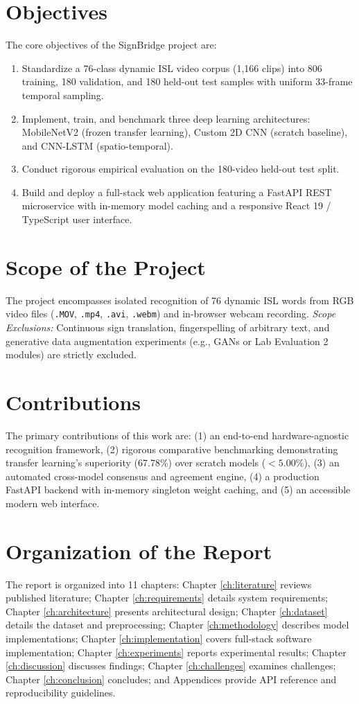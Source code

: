 \section{Objectives}
\label{sec:objectives}
The core objectives of the SignBridge project are:
\begin{enumerate}
    \item Standardize a 76-class dynamic ISL video corpus (1,166 clips) into 806 training, 180 validation, and 180 held-out test samples with uniform 33-frame temporal sampling.
    \item Implement, train, and benchmark three deep learning architectures: MobileNetV2 (frozen transfer learning), Custom 2D CNN (scratch baseline), and CNN-LSTM (spatio-temporal).
    \item Conduct rigorous empirical evaluation on the 180-video held-out test split.
    \item Build and deploy a full-stack web application featuring a FastAPI REST microservice with in-memory model caching and a responsive React 19 / TypeScript user interface.
\end{enumerate}

\section{Scope of the Project}
\label{sec:scope}
The project encompasses isolated recognition of 76 dynamic ISL words from RGB video files (\texttt{.MOV}, \texttt{.mp4}, \texttt{.avi}, \texttt{.webm}) and in-browser webcam recording. 
\textit{Scope Exclusions:} Continuous sign translation, fingerspelling of arbitrary text, and generative data augmentation experiments (e.g., GANs or Lab Evaluation 2 modules) are strictly excluded.

\section{Contributions}
\label{sec:contributions}
The primary contributions of this work are: (1) an end-to-end hardware-agnostic recognition framework, (2) rigorous comparative benchmarking demonstrating transfer learning's superiority (67.78\%) over scratch models ($<5.00\%$), (3) an automated cross-model consensus and agreement engine, (4) a production FastAPI backend with in-memory singleton weight caching, and (5) an accessible modern web interface.

\section{Organization of the Report}
\label{sec:organization}
The report is organized into 11 chapters: Chapter \ref{ch:literature} reviews published literature; Chapter \ref{ch:requirements} details system requirements; Chapter \ref{ch:architecture} presents architectural design; Chapter \ref{ch:dataset} details the dataset and preprocessing; Chapter \ref{ch:methodology} describes model implementations; Chapter \ref{ch:implementation} covers full-stack software implementation; Chapter \ref{ch:experiments} reports experimental results; Chapter \ref{ch:discussion} discusses findings; Chapter \ref{ch:challenges} examines challenges; Chapter \ref{ch:conclusion} concludes; and Appendices provide API reference and reproducibility guidelines.
